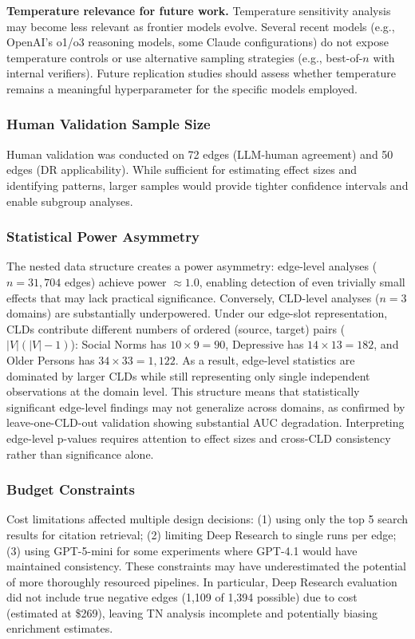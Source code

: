 \textbf{Temperature relevance for future work.} Temperature sensitivity analysis may become less relevant as frontier models evolve. Several recent models (e.g., OpenAI's o1/o3 reasoning models, some Claude configurations) do not expose temperature controls or use alternative sampling strategies (e.g., best-of-$n$ with internal verifiers). Future replication studies should assess whether temperature remains a meaningful hyperparameter for the specific models employed.

\subsubsection{Human Validation Sample Size}

Human validation was conducted on 72 edges (LLM-human agreement) and 50 edges (DR applicability). While sufficient for estimating effect sizes and identifying patterns, larger samples would provide tighter confidence intervals and enable subgroup analyses.

\subsubsection{Statistical Power Asymmetry}

The nested data structure creates a power asymmetry: edge-level analyses ($n = 31{,}704$ edges) achieve power $\approx 1.0$, enabling detection of even trivially small effects that may lack practical significance. Conversely, CLD-level analyses ($n = 3$ domains) are substantially underpowered. Under our edge-slot representation, CLDs contribute different numbers of ordered (source, target) pairs ($|V|(|V|-1)$): Social Norms has $10\times 9=90$, Depressive has $14\times 13=182$, and Older Persons has $34\times 33=1{,}122$. As a result, edge-level statistics are dominated by larger CLDs while still representing only single independent observations at the domain level. This structure means that statistically significant edge-level findings may not generalize across domains, as confirmed by leave-one-CLD-out validation showing substantial AUC degradation. Interpreting edge-level p-values requires attention to effect sizes and cross-CLD consistency rather than significance alone.

\subsubsection{Budget Constraints}

Cost limitations affected multiple design decisions: (1) using only the top 5 search results for citation retrieval; (2) limiting Deep Research to single runs per edge; (3) using GPT-5-mini for some experiments where GPT-4.1 would have maintained consistency. These constraints may have underestimated the potential of more thoroughly resourced pipelines.
In particular, Deep Research evaluation did not include true negative edges (1,109 of 1,394 possible) due to cost (estimated at \$269), leaving TN analysis incomplete and potentially biasing enrichment estimates.

